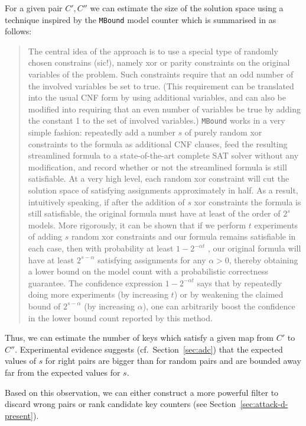 For a given pair $C',C''$ we can estimate the size of the solution space using a technique inspired by the \texttt{MBound} model counter which is summarised in  \cite{Gomes-Sabharwal-Selman-2009} as follows:

\begin{quote}
The central idea of the approach is to use a special type of randomly chosen constrains (sic!), namely xor or parity constraints on the original variables of the problem. Such constraints require that an odd number of the involved variables be set to true. (This requirement can be translated into the usual CNF form by using additional variables, and can also be modified into requiring that an even number of variables be true by adding the constant 1 to the set of involved variables.) \texttt{MBound} works in a very simple fashion: repeatedly add a number $s$ of purely random xor constraints to the formula as additional CNF clauses, feed the resulting streamlined formula to a state-of-the-art complete SAT solver without any modification, and record whether or not the streamlined formula is still satisfiable. At a very high level, each random xor constraint will cut the solution space of satisfying assignments approximately in half. As a result, intuitively speaking, if after the addition of $s$ xor constraints the formula is still satisfiable, the original formula must have at least of the order of $2^s$ models. More rigorously, it can be shown that if we perform $t$ experiments of adding $s$ random xor constraints and our formula remains satisfiable in each case, then with probability at least $1 − 2^{−\alpha t}$ , our original formula will have at least $2^{s−\alpha}$ satisfying assignments for any $\alpha > 0$, thereby obtaining a lower bound on the model count with a probabilistic correctness guarantee. The confidence expression $1 − 2^{−\alpha t}$ says that by repeatedly doing more experiments (by increasing $t$) or by weakening the claimed bound of $2^{s−\alpha}$ (by increasing $\alpha$), one can arbitrarily boost the confidence in the lower bound count reported by this method.
\end{quote}


Thus, we can estimate the number of keys which satisfy a given map from $C'$ to $C''$. Experimental evidence suggests (cf.~Section~\ref{sec:adc}) that the expected values of $s$ for right pairs are bigger than for random pairs and are bounded away far from the expected values for $s$.

Based on this observation, we can either construct a more powerful filter to discard wrong pairs or rank candidate key counters (see Section~\ref{sec:attack-d-present}).

